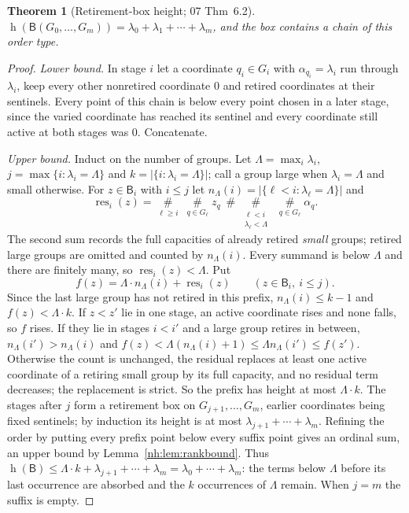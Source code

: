 \documentclass[11pt,a4paper]{article}
\newtheorem{theorem}{Theorem}[section]
\theoremstyle{definition}
\theoremstyle{remark}
\newcommand{\hgt}{\operatorname{h}}
\newcommand{\ns}{\mathbin{\#}}
\newcommand{\bigns}{\mathop{\#}\limits}
\begin{document}
\begin{theorem}[Retirement-box height; 07 Thm~6.2]\label{nh:thm:boxes}
$\hgt(\mathsf B(G_0,\dots,G_m))=\lambda_0+\lambda_1+\cdots+\lambda_m$, and the
box contains a chain of this order type.
\end{theorem}
\begin{proof}
\emph{Lower bound.} In stage $i$ let a coordinate $q_i\in G_i$ with
$\alpha_{q_i}=\lambda_i$ run through $\lambda_i$, keep every other nonretired
coordinate $0$ and retired coordinates at their sentinels. Every point of this
chain is below every point chosen in a later stage, since the varied
coordinate has reached its sentinel and every coordinate still active at both
stages was $0$. Concatenate.

\emph{Upper bound.} Induct on the number of groups. Let
$\Lambda=\max_i\lambda_i$, $j=\max\{i:\lambda_i=\Lambda\}$ and
$k=|\{i:\lambda_i=\Lambda\}|$; call a group large when $\lambda_i=\Lambda$ and
small otherwise. For $z\in\mathsf B_i$ with $i\le j$ let
$n_\Lambda(i)=|\{\ell<i:\lambda_\ell=\Lambda\}|$ and
\begin{equation}\label{nh:eq:residual}
 \operatorname{res}_i(z)=\bigns_{\ell\ge i}\ \bigns_{q\in G_\ell}z_q
 \ \ns\bigns_{\substack{\ell<i\\ \lambda_\ell<\Lambda}}\ \bigns_{q\in G_\ell}\alpha_q .
\end{equation}
The second sum records the full capacities of already retired \emph{small}
groups; retired large groups are omitted and counted by $n_\Lambda(i)$. Every
summand is below $\Lambda$ and there are finitely many, so
$\operatorname{res}_i(z)<\Lambda$. Put
\begin{equation}\label{nh:eq:prefixrank}
 f(z)=\Lambda\cdot n_\Lambda(i)+\operatorname{res}_i(z)\qquad(z\in\mathsf B_i,\ i\le j).
\end{equation}
Since the last large group has not retired in this prefix, $n_\Lambda(i)\le k-1$
and $f(z)<\Lambda\cdot k$. If $z<z'$ lie in one stage, an active coordinate
rises and none falls, so $f$ rises. If they lie in stages $i<i'$ and a large
group retires in between, $n_\Lambda(i')>n_\Lambda(i)$ and
$f(z)<\Lambda(n_\Lambda(i)+1)\le\Lambda n_\Lambda(i')\le f(z')$. Otherwise the
count is unchanged, the residual replaces at least one active coordinate of a
retiring small group by its full capacity, and no residual term decreases; the
replacement is strict. So the prefix has height at most $\Lambda\cdot k$. The
stages after $j$ form a retirement box on $G_{j+1},\dots,G_m$, earlier
coordinates being fixed sentinels; by induction its height is at most
$\lambda_{j+1}+\cdots+\lambda_m$. Refining the order by putting every prefix
point below every suffix point gives an ordinal sum, an upper bound by
Lemma~\ref{nh:lem:rankbound}. Thus
$\hgt(\mathsf B)\le\Lambda\cdot k+\lambda_{j+1}+\cdots+\lambda_m
=\lambda_0+\cdots+\lambda_m$: the terms below $\Lambda$ before its last
occurrence are absorbed and the $k$ occurrences of $\Lambda$ remain. When $j=m$
the suffix is empty.
\end{proof}
\end{document}

